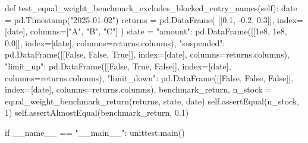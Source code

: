 \documentclass[UTF8,a4paper,fontset=fandol]{ctexart}
\begin{document}
\begin{ProjectCode}
    def test_equal_weight_benchmark_excludes_blocked_entry_names(self):
        date = pd.Timestamp("2025-01-02")
        returns = pd.DataFrame(
            [[0.1, -0.2, 0.3]], index=[date], columns=["A", "B", "C"]
        )
        state = {
            "amount": pd.DataFrame([[1e8, 1e8, 0.0]], index=[date], columns=returns.columns),
            "suspended": pd.DataFrame([[False, False, True]], index=[date], columns=returns.columns),
            "limit_up": pd.DataFrame([[False, True, False]], index=[date], columns=returns.columns),
            "limit_down": pd.DataFrame([[False, False, False]], index=[date], columns=returns.columns),
        }
        benchmark_return, n_stock = equal_weight_benchmark_return(returns, state, date)
        self.assertEqual(n_stock, 1)
        self.assertAlmostEqual(benchmark_return, 0.1)


if __name__ == "__main__":
    unittest.main()
\end{ProjectCode}
\clearpage
\end{document}
